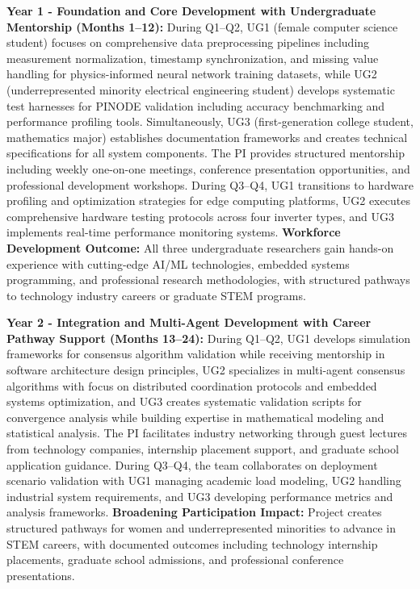 \documentclass[12pt]{article}
\begin{document}
\textbf{Year 1 - Foundation and Core Development with Undergraduate Mentorship (Months 1--12):} During Q1--Q2, UG1 (female computer science student) focuses on comprehensive data preprocessing pipelines including measurement normalization, timestamp synchronization, and missing value handling for physics-informed neural network training datasets, while UG2 (underrepresented minority electrical engineering student) develops systematic test harnesses for PINODE validation including accuracy benchmarking and performance profiling tools. Simultaneously, UG3 (first-generation college student, mathematics major) establishes documentation frameworks and creates technical specifications for all system components. The PI provides structured mentorship including weekly one-on-one meetings, conference presentation opportunities, and professional development workshops. During Q3--Q4, UG1 transitions to hardware profiling and optimization strategies for edge computing platforms, UG2 executes comprehensive hardware testing protocols across four inverter types, and UG3 implements real-time performance monitoring systems. \textbf{Workforce Development Outcome:} All three undergraduate researchers gain hands-on experience with cutting-edge AI/ML technologies, embedded systems programming, and professional research methodologies, with structured pathways to technology industry careers or graduate STEM programs.

\textbf{Year 2 - Integration and Multi-Agent Development with Career Pathway Support (Months 13--24):} During Q1--Q2, UG1 develops simulation frameworks for consensus algorithm validation while receiving mentorship in software architecture design principles, UG2 specializes in multi-agent consensus algorithms with focus on distributed coordination protocols and embedded systems optimization, and UG3 creates systematic validation scripts for convergence analysis while building expertise in mathematical modeling and statistical analysis. The PI facilitates industry networking through guest lectures from technology companies, internship placement support, and graduate school application guidance. During Q3--Q4, the team collaborates on deployment scenario validation with UG1 managing academic load modeling, UG2 handling industrial system requirements, and UG3 developing performance metrics and analysis frameworks. \textbf{Broadening Participation Impact:} Project creates structured pathways for women and underrepresented minorities to advance in STEM careers, with documented outcomes including technology internship placements, graduate school admissions, and professional conference presentations.
\end{document}
